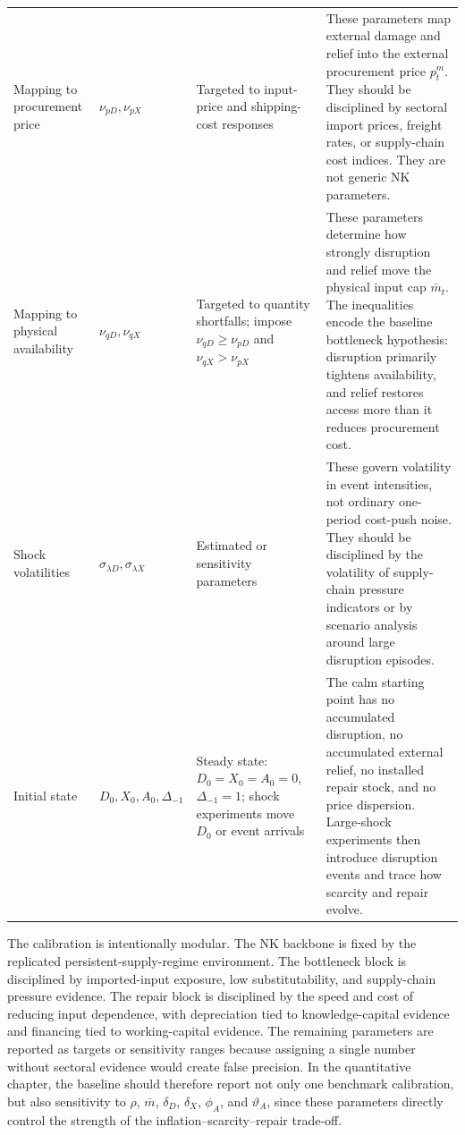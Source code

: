 ﻿\documentclass[12pt]{article}
\theoremstyle{remark}
\begin{document}
\begin{longtable}{
>{\raggedright\arraybackslash}p{}
>{\raggedright\arraybackslash}p{}
>{\raggedright\arraybackslash}p{}
>{\raggedright\arraybackslash}p{}}
Mapping to procurement price
&
$\nu_{pD},\nu_{pX}$
&
Targeted to input-price and shipping-cost responses
&
These parameters map external damage and relief into the external procurement price $p_t^m$.
They should be disciplined by sectoral import prices, freight rates, or supply-chain cost indices.
They are not generic NK parameters.
\\

Mapping to physical availability
&
$\nu_{qD},\nu_{qX}$
&
Targeted to quantity shortfalls; impose $\nu_{qD}\ge\nu_{pD}$ and $\nu_{qX}>\nu_{pX}$
&
These parameters determine how strongly disruption and relief move the physical input cap
$\bar m_t$. The inequalities encode the baseline bottleneck hypothesis: disruption primarily
tightens availability, and relief restores access more than it reduces procurement cost.
\\

Shock volatilities
&
$\sigma_{\lambda D},\sigma_{\lambda X}$
&
Estimated or sensitivity parameters
&
These govern volatility in event intensities, not ordinary one-period cost-push noise. They should
be disciplined by the volatility of supply-chain pressure indicators or by scenario analysis around
large disruption episodes.
\\

Initial state
&
$D_0,X_0,A_0,\Delta_{-1}$
&
Steady state: $D_0=X_0=A_0=0$, $\Delta_{-1}=1$; shock experiments move $D_0$ or event arrivals
&
The calm starting point has no accumulated disruption, no accumulated external relief, no installed
repair stock, and no price dispersion. Large-shock experiments then introduce disruption events and
trace how scarcity and repair evolve.
\\

\end{longtable}
\endgroup

The calibration is intentionally modular. The NK backbone is fixed by the replicated
persistent-supply-regime environment. The bottleneck block is disciplined by imported-input
exposure, low substitutability, and supply-chain pressure evidence. The repair block is disciplined
by the speed and cost of reducing input dependence, with depreciation tied to knowledge-capital
evidence and financing tied to working-capital evidence. The remaining parameters are reported as
targets or sensitivity ranges because assigning a single number without sectoral evidence would
create false precision. In the quantitative chapter, the baseline should therefore report not only
one benchmark calibration, but also sensitivity to $\rho$, $\bar m$, $\delta_D$, $\delta_X$,
$\phi_A$, and $\vartheta_A$, since these parameters directly control the strength of the
inflation--scarcity--repair trade-off.
\end{document}
